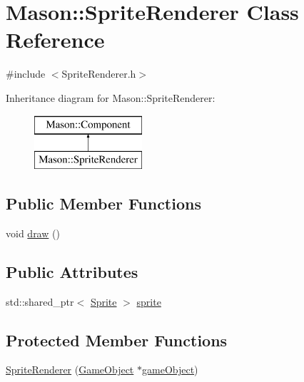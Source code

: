 \hypertarget{class_mason_1_1_sprite_renderer}{}\section{Mason\+:\+:Sprite\+Renderer Class Reference}
\label{class_mason_1_1_sprite_renderer}


{\ttfamily \#include $<$Sprite\+Renderer.\+h$>$}

Inheritance diagram for Mason\+:\+:Sprite\+Renderer\+:\begin{figure}[H]
\begin{center}
\leavevmode
\includegraphics[height=2.000000cm]{class_mason_1_1_sprite_renderer}
\end{center}
\end{figure}
\subsection*{Public Member Functions}
\begin{DoxyCompactItemize}
\item 
void \hyperlink{class_mason_1_1_sprite_renderer_aeeeaa7eb5c340b7c2abad3d4785fd1e1}{draw} ()
\end{DoxyCompactItemize}
\subsection*{Public Attributes}
\begin{DoxyCompactItemize}
\item 
std\+::shared\+\_\+ptr$<$ \hyperlink{class_mason_1_1_sprite}{Sprite} $>$ \hyperlink{class_mason_1_1_sprite_renderer_a17a9d82d45d7ae1058542e5c939122c6}{sprite}
\end{DoxyCompactItemize}
\subsection*{Protected Member Functions}
\begin{DoxyCompactItemize}
\item 
\hyperlink{class_mason_1_1_sprite_renderer_a82f81ad1b56677f6194d91956b213add}{Sprite\+Renderer} (\hyperlink{class_mason_1_1_game_object}{Game\+Object} $\ast$\hyperlink{class_mason_1_1_component_a30030370c35f5562cbbbb0927b0448c8}{game\+Object})
\end{DoxyCompactItemize}
